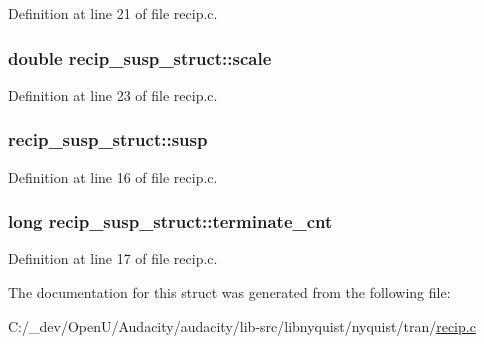Definition at line 21 of file recip.\+c.

\subsubsection[{\texorpdfstring{scale}{scale}}]{\setlength{\rightskip}{0pt plus 5cm}double recip\+\_\+susp\+\_\+struct\+::scale}\hypertarget{structrecip__susp__struct_a0ad922af2222f2d25bd8aac11643fe7f}{}\label{structrecip__susp__struct_a0ad922af2222f2d25bd8aac11643fe7f}


Definition at line 23 of file recip.\+c.

\subsubsection[{\texorpdfstring{susp}{susp}}]{ recip\+\_\+susp\+\_\+struct\+::susp}\hypertarget{structrecip__susp__struct_a5212739dd1ad43966a7a9d0992ea3656}{}\label{structrecip__susp__struct_a5212739dd1ad43966a7a9d0992ea3656}


Definition at line 16 of file recip.\+c.

\subsubsection[{\texorpdfstring{terminate\+\_\+cnt}{terminate_cnt}}]{\setlength{\rightskip}{0pt plus 5cm}long recip\+\_\+susp\+\_\+struct\+::terminate\+\_\+cnt}\hypertarget{structrecip__susp__struct_a92e5951c8c47c33f7fb2516cbce57e78}{}\label{structrecip__susp__struct_a92e5951c8c47c33f7fb2516cbce57e78}


Definition at line 17 of file recip.\+c.



The documentation for this struct was generated from the following file\+:\begin{DoxyCompactItemize}
\item 
C\+:/\+\_\+dev/\+Open\+U/\+Audacity/audacity/lib-\/src/libnyquist/nyquist/tran/\hyperlink{recip_8c}{recip.\+c}\end{DoxyCompactItemize}
